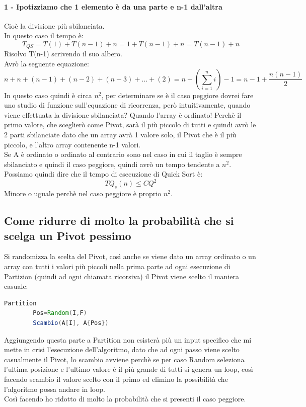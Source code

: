 \paragraph*{1 - Ipotizziamo che 1 elemento è da una parte e n-1 dall'altra} Cioè la divisione più sbilanciata.\\
In questo caso il tempo è:
\begin{equation*}
    T_{QS}=T(1)+T(n-1)+n = 1+T(n-1)+n = T(n-1)+n
\end{equation*}
Risolvo T(n-1) scrivendo il suo albero.\\
Avrò la seguente equazione:
\begin{equation*}
    n+n+(n-1)+(n-2)+(n-3)+\dots+(2)=n+(\sum_{i=1}^n i)-1=n-1+\frac{n(n-1)}{2}
\end{equation*}
In questo caso quindi è circa $n^2$, per determinare se è il caso peggiore dovrei
fare uno studio di funzione sull'equazione di ricorrenza, però intuitivamente, quando viene effettuata la divisione
sbilanciata? Quando l'array è ordinato! Perchè il primo valore, che sceglierò come Pivot, sarà il più piccolo di tutti e
quindi avrò le 2 parti sbilanciate dato che un array avrà 1 valore solo, il Pivot che è il più piccolo, e l'altro array 
contenente n-1 valori.\\
Se A è ordinato o ordinato al contrario sono nel caso in cui il taglio è sempre sbilanciato e quindi il caso peggiore, quindi
avrò un tempo tendente a $n^2$.\\
Possiamo quindi dire che il tempo di esecuzione di Quick Sort è:
\begin{equation*}
    TQ_s(n)\leq CQ^2
\end{equation*}
Minore o uguale perchè nel caso peggiore è proprio $n^2$.
\subsection{Come ridurre di molto la probabilità che si scelga un Pivot pessimo}
Si randomizza la scelta del Pivot, così anche se viene dato un array ordinato o un array
con tutti i valori più piccoli nella prima parte ad ogni esecuzione di Partizion (quindi
ad ogni chiamata ricorsiva) il Pivot viene scelto il maniera casuale:
\begin{lstlisting}[language=Java]
    Partition
        Pos=Random(I,F)
        Scambio(A[I], A{Pos})
\end{lstlisting}
Aggiungendo questa parte a Partition non esisterà più un input specifico che mi mette
in crisi l'esecuzione dell'algoritmo, dato che ad ogni passo viene scelto casualmente
il Pivot, lo scambio avviene perchè se per caso Random seleziona l'ultima posizione e l'ultimo
valore è il più grande di tutti si genera un loop, così facendo scambio il valore scelto con il
primo ed elimino la possibilità che l'algoritmo possa andare in loop.\\
Così facendo ho ridotto di molto la probabilità che si presenti il caso peggiore.